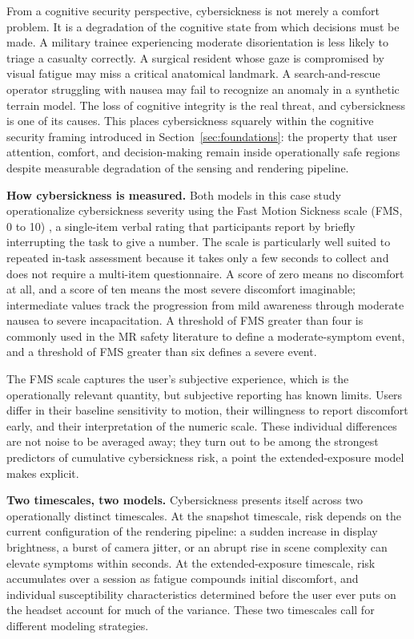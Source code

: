 \documentclass[graybox]{svmult}
\begin{document}
From a cognitive security perspective, cybersickness is not merely a comfort problem. It is a degradation of the cognitive state from which decisions must be made. A military trainee experiencing moderate disorientation is less likely to triage a casualty correctly. A surgical resident whose gaze is compromised by visual fatigue may miss a critical anatomical landmark. A search-and-rescue operator struggling with nausea may fail to recognize an anomaly in a synthetic terrain model. The loss of cognitive integrity is the real threat, and cybersickness is one of its causes. This places cybersickness squarely within the cognitive security framing introduced in Section~\ref{sec:foundations}: the property that user attention, comfort, and decision-making remain inside operationally safe regions despite measurable degradation of the sensing and rendering pipeline.

\textbf{How cybersickness is measured.}
Both models in this case study operationalize cybersickness severity using the Fast Motion Sickness scale (FMS, 0 to 10) \citep{keshavarz2011fms}, a single-item verbal rating that participants report by briefly interrupting the task to give a number. The scale is particularly well suited to repeated in-task assessment because it takes only a few seconds to collect and does not require a multi-item questionnaire. A score of zero means no discomfort at all, and a score of ten means the most severe discomfort imaginable; intermediate values track the progression from mild awareness through moderate nausea to severe incapacitation. A threshold of FMS greater than four is commonly used in the MR safety literature to define a moderate-symptom event, and a threshold of FMS greater than six defines a severe event.

The FMS scale captures the user's subjective experience, which is the operationally relevant quantity, but subjective reporting has known limits. Users differ in their baseline sensitivity to motion, their willingness to report discomfort early, and their interpretation of the numeric scale. These individual differences are not noise to be averaged away; they turn out to be among the strongest predictors of cumulative cybersickness risk, a point the extended-exposure model makes explicit.

\textbf{Two timescales, two models.}
Cybersickness presents itself across two operationally distinct timescales. At the snapshot timescale, risk depends on the current configuration of the rendering pipeline: a sudden increase in display brightness, a burst of camera jitter, or an abrupt rise in scene complexity can elevate symptoms within seconds. At the extended-exposure timescale, risk accumulates over a session as fatigue compounds initial discomfort, and individual susceptibility characteristics determined before the user ever puts on the headset account for much of the variance. These two timescales call for different modeling strategies.
\end{document}
